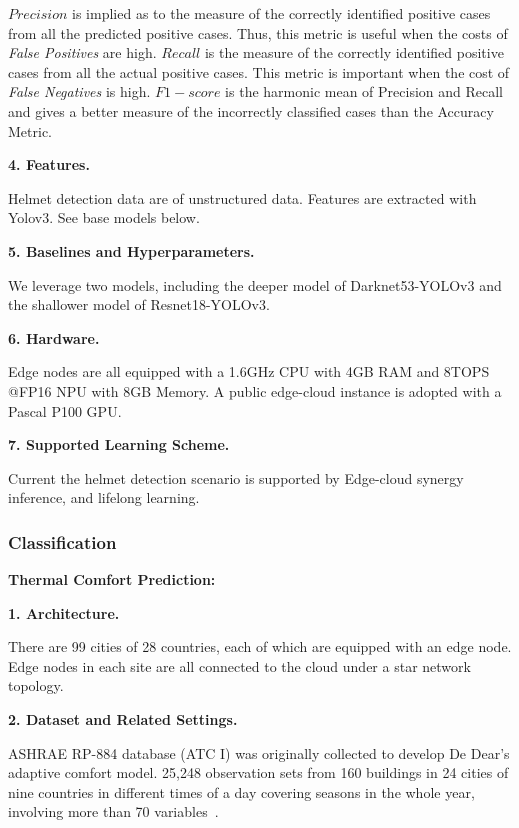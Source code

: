 $Precision$ is implied as to the measure of the correctly identified positive cases from all the predicted positive cases. Thus, this metric is useful when the costs of \textit{False Positives} are high. $Recall$ is the measure of the correctly identified positive cases from all the actual positive cases. This metric is important when the cost of \textit{False Negatives} is high. $F1-score$ is the harmonic mean of Precision and Recall and gives a better measure of the incorrectly classified cases than the Accuracy Metric.

\textbf{4. Features.}

Helmet detection data are of unstructured data. Features are extracted with Yolov3. See base models below. 

\textbf{5. Baselines and Hyperparameters.}

We leverage two models, including the deeper model of  Darknet53-YOLOv3 and the shallower model of Resnet18-YOLOv3. 


\textbf{6. Hardware.}

Edge nodes are all equipped with a 1.6GHz CPU with 4GB RAM and 8TOPS @FP16 NPU with 8GB Memory. A public edge-cloud instance is adopted with a Pascal P100 GPU. 

\textbf{7. Supported Learning Scheme.}

Current the helmet detection scenario is supported by Edge-cloud synergy inference, and lifelong learning.



\subsubsection{Classification}

\textbf{Thermal Comfort Prediction:} 

\textbf{1. Architecture.}

There are 99 cities of 28 countries, each of which are equipped with an edge node. Edge nodes in each site are all connected to the cloud under a star network topology.

\textbf{2. Dataset and Related Settings.}

ASHRAE RP-884 database (ATC I) was originally collected to develop De Dear's adaptive comfort model. 25,248 observation sets from 160 buildings in 24 cities of nine countries in different times of a day covering seasons in the whole year, involving more than 70 variables~\cite{de97,arp18}.

